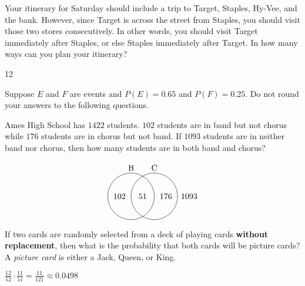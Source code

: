 \documentclass[addpoints,12pt]{exam}
\begin{document}
\begin{questions}
\question[15] Your itinerary for Saturday should
include a trip to Target, Staples, Hy-Vee, and the bank.
However, since Target is across the street from Staples,
you should visit those two stores consecutively. In other
words, you should visit Target immediately after Staples, or else
Staples immediately after Target. In how many ways
can you plan your itinerary?
\begin{solution}[4in]12\end{solution}

\question[12] Suppose $E$ and $F$ are events
and $P\left(E\right)=0.65$ and $P\left(F\right)=0.25$.
Do not round your answers to the following questions.
\ifprintanswers\else\newpage\fi

\question[12] Ames High School has $1422$ students.
$102$ students are in band but not chorus while
$176$ students are in chorus but not band.
If $1093$ students are in neither band nor chorus,
then how many students are in both band and chorus?
\begin{solution}[4in]
\[\begin{xy}<.5cm,0cm>:
(-1,2)*+!D{\text{B}};
(1,2)*+!D{\text{C}};
(-1,0)*\cir<1cm>{};
(1,0)*\cir<1cm>{};
(0,0)*{51};
(-2,0)*{102};
(2,0)*{176};
(4,0)*{1093};
\end{xy}\]
\end{solution}

\question[10] If two cards are randomly selected from a deck
of playing cards {\bf without replacement},
then what is the probability that both cards
will be picture cards?  A {\em picture card} is either a Jack, Queen, or King.
\begin{solution}
$\frac{12}{52}\cdot\frac{11}{51}=\frac{11}{121}\approx 0.0498$
\end{solution}

\end{questions}

\vfill\ifprintanswers\else
\begin{center}\gradetable[h][questions]\end{center}\fi
\end{document}
